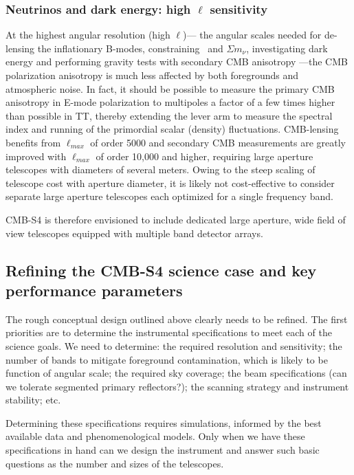 \subsubsection{Neutrinos and dark energy: high $\ell$ sensitivity}

At the highest angular resolution (high $\ell$)--- the angular scales needed for de-lensing the inflationary B-modes, constraining \neff\ and $\Sigma m_\nu$,  investigating dark energy and performing gravity tests with secondary CMB  anisotropy ---the CMB polarization anisotropy is much less affected by both foregrounds and atmospheric noise. In fact, it should be possible to measure the primary CMB anisotropy in E-mode polarization to multipoles a factor of a few times higher than possible in TT, thereby extending the lever arm to measure the spectral index and running of the primordial scalar (density) fluctuations. CMB-lensing benefits from $\ell_{max}$ of order 5000 and secondary CMB measurements are greatly improved with $\ell_{max}$ of order 10,000 and higher, requiring large aperture telescopes with diameters of several meters. Owing to the steep scaling of telescope cost with aperture diameter, it is likely not cost-effective to consider separate large aperture telescopes each optimized for a single frequency band. 

CMB-S4 is therefore envisioned to include dedicated large aperture, wide field of view telescopes equipped with multiple band detector arrays.

\subsection{Refining the CMB-S4 science case and key performance parameters}

The rough conceptual design outlined above clearly needs to be refined.  The first priorities are to determine the instrumental specifications to meet each of the science goals. We need to determine:  the required resolution and sensitivity; the number of bands to mitigate foreground contamination, which is likely to be function of angular scale; the required sky coverage; the beam specifications (can we tolerate segmented primary reflectors?); the scanning strategy and instrument stability; etc.

Determining these specifications requires simulations, informed by the best available data and phenomenological models.  Only when we have these specifications in hand can we design the instrument and answer such basic questions as the number and sizes of the telescopes. 

